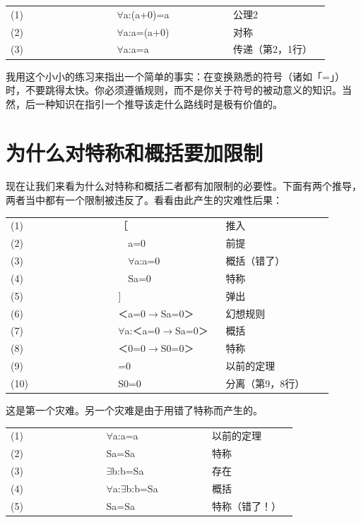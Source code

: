 \documentclass[
  12pt,
  twoside,
  openright,
  oldfontcommands,
]{memoir}
\begin{document}
\begin{longtable}[]{>{\raggedright\arraybackslash}p{0.313\linewidth} >{\raggedright\arraybackslash}p{0.313\linewidth} >{\raggedright\arraybackslash}p{0.313\linewidth}}
\toprule\noalign{}
\endhead
\bottomrule\noalign{}
\endlastfoot
(1) & $\forall$a:(a+0)=a & 　公理2 \\
(2) & $\forall$a:a=(a+0) & 　对称 \\
(3) & $\forall$a:a=a & 　传递（第2，1行） \\
\end{longtable}

我用这个小小的练习来指出一个简单的事实：在变换熟悉的符号（诸如「=」）时，不要跳得太快。你必须遵循规则，而不是你关于符号的被动意义的知识。当然，后一种知识在指引一个推导该走什么路线时是极有价值的。

\section{为什么对特称和概括要加限制}

现在让我们来看为什么对特称和概括二者都有加限制的必要性。下面有两个推导，两者当中都有一个限制被违反了。看看由此产生的灾难性后果：

\begin{longtable}[]{>{\raggedright\arraybackslash}p{0.313\linewidth} >{\raggedright\arraybackslash}p{0.313\linewidth} >{\raggedright\arraybackslash}p{0.313\linewidth}}
\toprule\noalign{}
\endhead
\bottomrule\noalign{}
\endlastfoot
(1) & ［ & 推入 \\
(2) & 　a=0 & 前提 \\
(3) & 　$\forall$a:a=0 & 概括（错了） \\
(4) & 　Sa=0 & 特称 \\
(5) & {]} & 弹出 \\
(6) & ＜a=0$\rightarrow$Sa=0＞ & 幻想规则 \\
(7) & $\forall$a:＜a=0$\rightarrow$Sa=0＞ & 概括 \\
(8) & ＜0=0$\rightarrow$S0=0＞ & 特称 \\
(9) & 0=0 & 以前的定理 \\
(10) & S0=0 & 分离（第9，8行） \\
\end{longtable}

这是第一个灾难。另一个灾难是由于用错了特称而产生的。

\begin{longtable}[]{>{\raggedright\arraybackslash}p{0.313\linewidth} >{\raggedright\arraybackslash}p{0.313\linewidth} >{\raggedright\arraybackslash}p{0.313\linewidth}}
\toprule\noalign{}
\endhead
\bottomrule\noalign{}
\endlastfoot
(1) & $\forall$a:a=a & 　以前的定理 \\
(2) & Sa=Sa & 　特称 \\
(3) & $\exists$b:b=Sa & 　存在 \\
(4) & $\forall$a:$\exists$b:b=Sa & 　概括 \\
(5) & Sa=Sa & 　特称（错了！） \\
\end{longtable}
\end{document}
